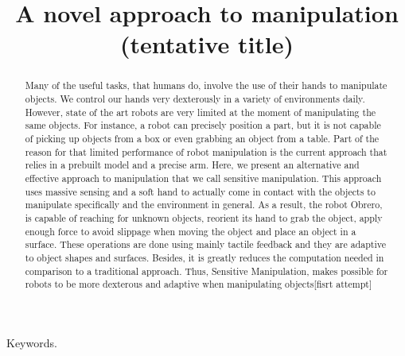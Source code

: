 \documentclass[conference,letterpaper]{IEEEtran}
\begin{document}
\title{\huge A novel approach to manipulation (tentative title)}

\author{
\and
{}
}

\maketitle
\begin{abstract}
Many of the useful tasks, that humans do, involve the use of their
hands to manipulate objects. We control our hands very dexterously
in a variety of environments daily. However, state of the art
robots are very limited at the moment of manipulating the same
objects. For instance, a robot can precisely position a part, but
it is not capable of picking up objects from a box or even
grabbing an object from a table. Part of the reason for that
limited performance of robot manipulation is the current approach
that relies in a prebuilt model and a precise arm. Here, we
present an alternative and effective approach to manipulation that
we call sensitive manipulation. This approach uses massive sensing
and a soft hand to actually come in contact with the objects to
manipulate specifically and the environment in general. As a
result, the robot Obrero, is capable of reaching for unknown
objects, reorient its hand to grab the object, apply enough force
to avoid slippage when moving the object and place an object in a
surface. These operations are done using mainly tactile feedback
and they are adaptive to object shapes and surfaces. Besides, it
is greatly reduces the computation needed in comparison to a
traditional approach. Thus, Sensitive Manipulation, makes possible
for robots to be more dexterous and adaptive when manipulating
objects[fisrt attempt]

\end{abstract}

\begin{keywords}
Keywords.
\end{keywords}
%



%


\end{document}
